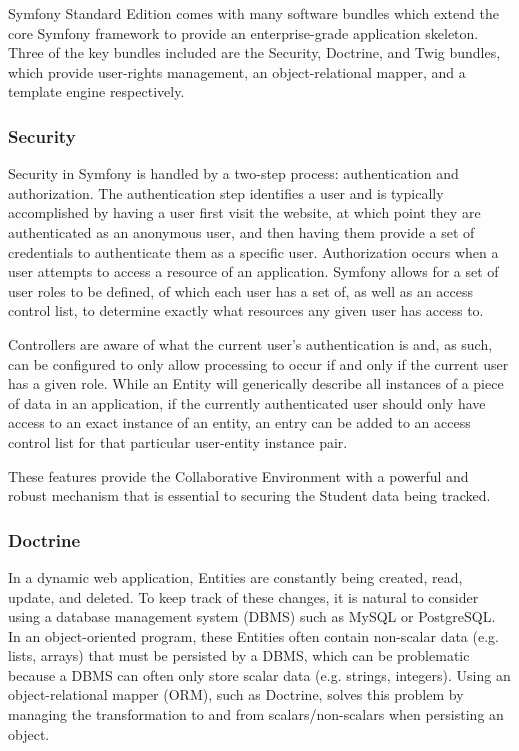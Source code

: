 Symfony Standard Edition comes with many software bundles which extend the core Symfony framework to provide an enterprise-grade application skeleton. Three of the key bundles included are the Security, Doctrine, and Twig bundles, which provide user-rights management, an object-relational mapper, and a template engine respectively.

\subsubsection{Security}
Security in Symfony is handled by a two-step process: authentication and authorization. The authentication step identifies a user and is typically accomplished by having a user first visit the website, at which point they are authenticated as an anonymous user, and then having them provide a set of credentials to authenticate them as a specific user. Authorization occurs when a user attempts to access a resource of an application. Symfony allows for a set of user roles to be defined, of which each user has a set of, as well as an access control list, to determine exactly what resources any given user has access to.

Controllers are aware of what the current user's authentication is and, as such, can be configured to only allow processing to occur if and only if the current user has a given role. While an Entity will generically describe all instances of a piece of data in an application, if the currently authenticated user should only have access to an exact instance of an entity, an entry can be added to an access control list for that particular user-entity instance pair.

These features provide the Collaborative Environment with a powerful and robust mechanism that is essential to securing the Student data being tracked.

\subsubsection{Doctrine}
In a dynamic web application, Entities are constantly being created, read, update, and deleted. To keep track of these changes, it is natural to consider using a database management system (DBMS) such as MySQL or PostgreSQL. In an object-oriented program, these Entities often contain non-scalar data (e.g. lists, arrays) that must be persisted by a DBMS, which can be problematic because a DBMS can often only store scalar data (e.g. strings, integers). Using an object-relational mapper (ORM), such as Doctrine, solves this problem by managing the transformation to and from scalars/non-scalars when persisting an object.

